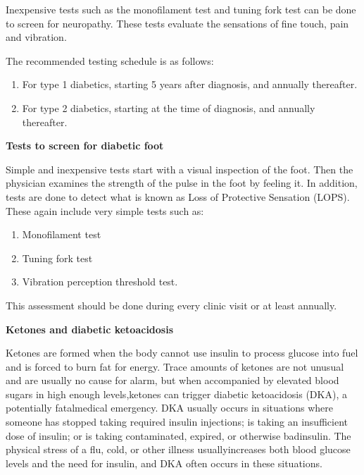 Inexpensive tests such as the monofilament test and tuning fork test can be done to screen for neuropathy. These tests evaluate the sensations of fine touch, pain and vibration.

\noindent The recommended testing schedule is as follows:

\vspace{-\topsep}
\begin{enumerate}[•]
\itemsep=0pt
\item For type 1 diabetics, starting 5 years after diagnosis, and annually thereafter.
\item For type 2 diabetics, starting at the time of diagnosis, and annually thereafter.
\end{enumerate}
\vspace{-\topsep}

\noindent\textbf{Tests to screen for diabetic foot}

Simple and inexpensive tests start with a visual inspection of the foot. Then the physician examines the strength of the pulse in the foot by feeling it. In addition, tests are done to detect what is known as Loss of Protective Sensation (LOPS). These again include very simple tests such as:

\vspace{-\topsep}
\begin{enumerate}[•]
\itemsep=0pt
\item Monofilament test
\item Tuning fork test
\item Vibration perception threshold test.
\end{enumerate}
\vspace{-\topsep}

This assessment should be done during every clinic visit or at least annually.

\noindent\textbf{Ketones and diabetic ketoacidosis}

Ketones are formed when the body cannot use insulin to process glucose into fuel and is forced to burn fat for energy. Trace amounts of ketones are not unusual and are usually no cause for alarm, but when accompanied by elevated blood sugars in high enough levels,\break ketones can trigger diabetic ketoacidosis (DKA), a potentially fatal\break medical emergency. DKA usually occurs in situations where someone has stopped taking required insulin injections; is taking an insufficient dose of insulin; or is taking contaminated, expired, or otherwise bad\break insulin. The physical stress of a flu, cold, or other illness usually\break increases both blood glucose levels and the need for insulin, and DKA often occurs in these situations.

